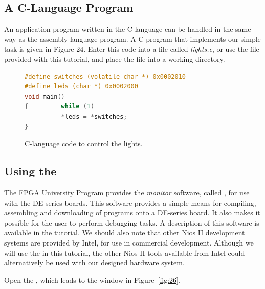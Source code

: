 \documentclass[11pt, twoside, pdftex]{article}
\begin{document}
\subsection{A C-Language Program}
An application program written in the C language can be handled in the same way as 
the assembly-language program. A C program that implements our simple task is 
given in Figure 24. Enter this code into a file called {\it lights.c},
or use the file provided with this tutorial, and place the file into a working directory. 
\\
\begin{figure}[H]
\begin{center}
\begin{lstlisting}[language=C]
#define switches (volatile char *) 0x0002010
#define leds (char *) 0x0002000
void main()
{         while (1)
          *leds = *switches;
}
\end{lstlisting}
\end{center}
	\caption{C-language code to control the lights.}
	\label{fig:25}
\end{figure}

\subsection{Using the \productNameMed{}}
The FPGA University Program provides the {\it monitor} software, called {\it \productNameMed{}}, 
for use with the DE-series boards. This software provides a simple means for compiling, assembling
and downloading of programs onto a DE-series board.
It also makes it possible for the user to perform debugging tasks.
A description of this software is available in the {\it \productNameMed{}} tutorial.
We should also note that other Nios II development systems are provided by Intel,
for use in commercial development.
Although we will use the \productNameMed{} in this tutorial, the other Nios II tools
available from Intel could alternatively be used with our designed hardware system.

Open the \productNameMed{}, which leads to the window in Figure~\ref{fig:26}.
~\\
\end{document}
